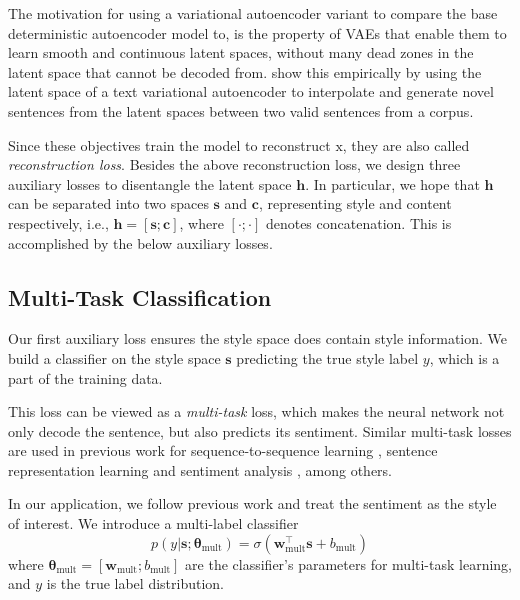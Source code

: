 \documentclass[11pt,a4paper]{article}
\newcommand{\rmx}{\mathrm x}
\begin{document}
The motivation for using a variational autoencoder variant to compare the base deterministic autoencoder model to, is the property of VAEs that enable them to learn smooth and continuous latent spaces, without many dead zones in the latent space that cannot be decoded from. \cite{bowman2016generating} show this empirically by using the latent space of a text variational autoencoder to interpolate and generate novel sentences from the latent spaces between two valid sentences from a corpus.


Since these objectives train the model to reconstruct $\rmx$, they are also called \textit{reconstruction loss}. Besides the above reconstruction loss, we design three auxiliary losses to disentangle the latent space $\bm h$. In particular, we hope that $\bm h$ can be separated into two spaces $\bm s$ and $\bm c$, representing style and content respectively, i.e., $\bm h = [\bm s ; \bm c]$, where $[\cdot;\cdot]$ denotes concatenation. This is accomplished by the below auxiliary losses.


\subsection{Multi-Task Classification} \label{ssec:multitask-classification-objective}

Our first auxiliary loss ensures the style space does contain style information. We build a classifier on the style space $\bm s$ predicting the true style label $y$, which is a part of the training data.

This loss can be viewed as a \textit{multi-task} loss, which makes the neural network not only decode the sentence, but also predicts its sentiment. Similar multi-task losses are used in previous work for sequence-to-sequence learning \cite{luong2015multi}, sentence representation learning \cite{jernite2017discourse} and sentiment analysis \cite{balikas2017multitask}, among others.

In our application, we follow previous work \cite{hu2017toward,shen2017style,fu2017style} and treat the sentiment as the style of interest. We introduce a multi-label classifier
\begin{equation} \label{eqn:class-pred}
	p(y | \bm s; \bm\theta_\text{mult}) = \sigma(\bm w_\text{mult}^\top \bm s + b_\text{mult})
\end{equation}
where $\bm\theta_\text{mult}=[\bm w_\text{mult}; b_\text{mult}]$ are the classifier's parameters for multi-task learning, and $y$ is the true label distribution.
\end{document}
